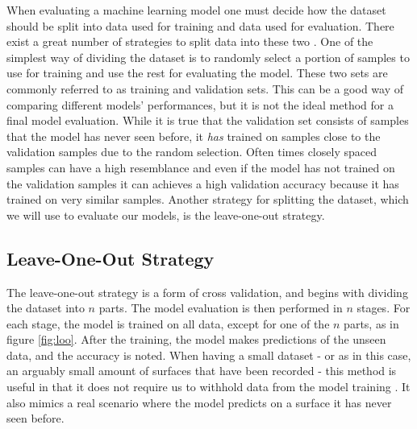 
When evaluating a machine learning model one must decide how the dataset should be split into data used for training and data used for evaluation. There exist a great number of strategies to split data into these two \citep{raschka}. One of the simplest way of dividing the dataset is to randomly select a portion of samples to use for training and use the rest for evaluating the model. These two sets are commonly referred to as training and validation sets. This can be a good way of comparing different models' performances, but it is not the ideal method for a final model evaluation. While it is true that the validation set consists of samples that the model has never seen before, it \textit{has} trained on samples close to the validation samples due to the random selection. Often times closely spaced samples can have a high resemblance and even if the model has not trained on the validation samples it can achieves a high validation accuracy because it has trained on very similar samples. Another strategy for splitting the dataset, which we will use to evaluate our models, is the leave-one-out strategy.




\subsection{Leave-One-Out Strategy}

The leave-one-out strategy is a form of cross validation, and begins with dividing the dataset into $n$ parts. The model evaluation is then performed in $n$ stages. For each stage, the model is trained on all data, except for one of the $n$ parts, as in figure \ref{fig:loo}. After the training, the model makes predictions of the unseen data, and the accuracy is noted. When having a small dataset - or as in this case, an arguably small amount of surfaces that have been recorded - this method is useful in that it does not require us to withhold data from the model training \citep{raschka}. It also mimics a real scenario where the model predicts on a surface it has never seen before.

